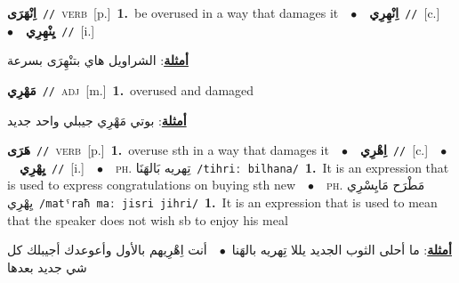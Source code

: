 \documentclass[10pt,a4paper,twoside]{article} %
\begin{document}
\begin{multicols}{2}
{\setlength\topsep{0pt}\textbf{\foreignlanguage{arabic}{اِنْهَرَى}}\ {\color{gray}\texttt{//}\color{black}}\ \textsc{verb}\ [p.]\ \textbf{1.}~be overused in a way that damages it\ \ $\bullet$\ \ \setlength\topsep{0pt}\textbf{\foreignlanguage{arabic}{اِنْهِرِي}}\ {\color{gray}\texttt{//}\color{black}}\ [c.]\ \ $\bullet$\ \ \setlength\topsep{0pt}\textbf{\foreignlanguage{arabic}{يِنْهِرِي}}\ {\color{gray}\texttt{//}\color{black}}\ [i.]\  \begin{flushright}\color{gray}\foreignlanguage{arabic}{\textbf{\underline{\foreignlanguage{arabic}{أمثلة}}}: الشراويل هاي بتنْهِرَى بسرعة}\end{flushright}\color{black}} \vspace{2mm}

{\setlength\topsep{0pt}\textbf{\foreignlanguage{arabic}{مَهْرِي}}\ {\color{gray}\texttt{//}\color{black}}\ \textsc{adj}\ [m.]\ \textbf{1.}~overused and damaged\  \begin{flushright}\color{gray}\foreignlanguage{arabic}{\textbf{\underline{\foreignlanguage{arabic}{أمثلة}}}: بوتي مَهْرِي جيبلي واحد جديد}\end{flushright}\color{black}} \vspace{2mm}

{\setlength\topsep{0pt}\textbf{\foreignlanguage{arabic}{هَرَى}}\ {\color{gray}\texttt{//}\color{black}}\ \textsc{verb}\ [p.]\ \textbf{1.}~overuse sth in a way that damages it\ \ $\bullet$\ \ \setlength\topsep{0pt}\textbf{\foreignlanguage{arabic}{اِهْرِي}}\ {\color{gray}\texttt{//}\color{black}}\ [c.]\ \ $\bullet$\ \ \setlength\topsep{0pt}\textbf{\foreignlanguage{arabic}{يِهْرِي}}\ {\color{gray}\texttt{//}\color{black}}\ [i.]\ \ $\bullet$\ \ \textsc{ph.} \color{gray} \foreignlanguage{arabic}{تِهريه بَالهَنَا}\color{black}\ {\color{gray}\texttt{/{\sffamily tihriː bilhana}/}\color{black}}\ \textbf{1.}~It is an expression that is used to express congratulations on buying sth new\ \ $\bullet$\ \ \textsc{ph.} \color{gray} \foreignlanguage{arabic}{مَطْرَح مَايِسْرِي يِهْرِي}\color{black}\ {\color{gray}\texttt{/{\sffamily matˤraħ maː jisri jihri}/}\color{black}}\ \textbf{1.}~It is an expression that is used to mean that the speaker does not wish sb to enjoy his meal\  \begin{flushright}\color{gray}\foreignlanguage{arabic}{\textbf{\underline{\foreignlanguage{arabic}{أمثلة}}}: ما أحلى الثوب الجديد يللا تِهريه بالهَنا\ $\bullet$\ \  أنت اِهْرِيهم بالأول وأعوعدك أجيبلك كل شي جديد بعدها}\end{flushright}\color{black}} \vspace{2mm}


\end{multicols}
\end{document}
